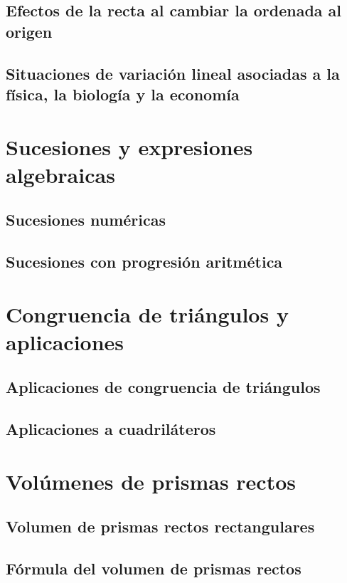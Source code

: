 \documentclass[11pt]{book}
\begin{document}
\subsection{Efectos de la recta al cambiar la ordenada al origen}
\subsection{Situaciones de variación lineal asociadas a la física, la biología y la economía}

\newpage \thispagestyle{plain}
\section{Sucesiones y expresiones algebraicas}
\subsection{Sucesiones numéricas}
\subsection{Sucesiones con progresión aritmética}

\newpage \thispagestyle{plain}
\section{Congruencia de triángulos y aplicaciones}
\subsection{Aplicaciones de congruencia de triángulos}
\subsection{Aplicaciones a cuadriláteros}

\newpage \thispagestyle{plain}
\section{Vol\'umenes de prismas rectos}
\subsection{Volumen de prismas rectos rectangulares}
\subsection{Fórmula del volumen de prismas rectos}
\end{document}

